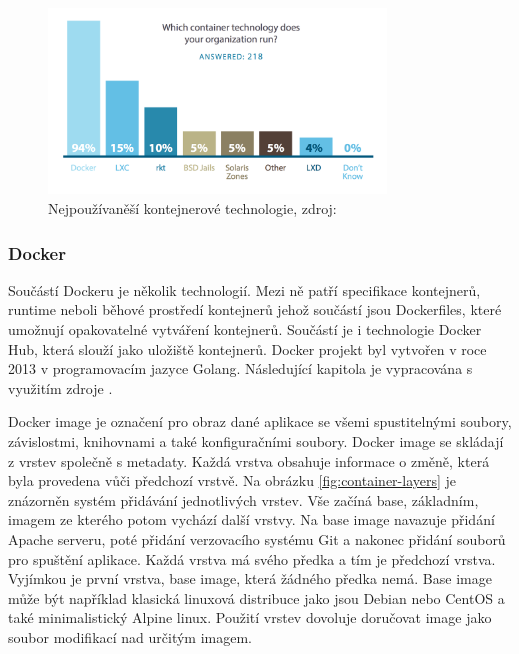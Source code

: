 \begin{figure}[H]
  \begin{centering}
    \includegraphics[width=0.8\textwidth]{images/docker.png}
    \par
	  \caption{Nejpoužívaněší kontejnerové technologie\label{fig:container}, zdroj: }
    \end{centering}
\end{figure}

\subsubsection{Docker}
Součástí Dockeru je několik technologií. Mezi ně patří specifikace kontejnerů, runtime neboli běhové prostředí kontejnerů jehož součástí jsou Dockerfiles, které umožnují opakovatelné vytváření kontejnerů. Součástí je i technologie Docker Hub, která slouží jako uložiště kontejnerů. Docker projekt byl vytvořen v roce 2013 v programovacím jazyce Golang. Následující kapitola je vypracována s využitím zdroje \cite{docker-security}.\par
Docker image je označení pro obraz dané aplikace se všemi spustitelnými soubory, závislostmi, knihovnami a také konfiguračními soubory. Docker image se skládají \linebreak z vrstev společně s metadaty. Každá vrstva obsahuje informace o změně, která byla provedena vůči předchozí vrstvě. Na obrázku \ref{fig:container-layers} je znázorněn systém přidávání jednotlivých vrstev. Vše začíná base, základním, imagem ze kterého potom vychází další vrstvy. Na base image navazuje přidání Apache serveru, poté přidání verzovacího systému Git a nakonec přidání souborů pro spuštění aplikace. Každá vrstva má svého předka a tím je předchozí vrstva. Vyjímkou je první vrstva, base image, která žádného předka nemá. Base image může být například klasická linuxová distribuce jako jsou Debian nebo CentOS a také minimalistický Alpine linux. Použití vrstev dovoluje doručovat image jako soubor modifikací nad určitým imagem. \par

